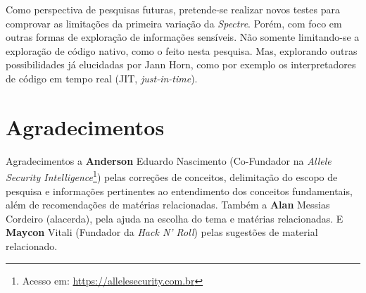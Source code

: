 \documentclass[conference]{IEEEtran}
\begin{document}
Como perspectiva de pesquisas futuras, pretende-se realizar novos testes para comprovar as limitações da primeira variação da \emph{Spectre}. Porém, com foco em outras formas de exploração de informações sensíveis. Não somente limitando-se a exploração de código nativo, como o feito nesta pesquisa. Mas, explorando outras possibilidades já elucidadas por Jann Horn, como por exemplo os interpretadores de código em tempo real (JIT, \emph{just-in-time}).

\section*{Agradecimentos}
Agradecimentos a \textbf{Anderson} Eduardo Nascimento (Co-Fundador na \emph{Allele Security Intelligence}\footnote{Acesso em: \url{https://allelesecurity.com.br}}) pelas correções de conceitos, delimitação do escopo de pesquisa e informações pertinentes ao entendimento dos conceitos fundamentais, além de recomendações de matérias relacionadas. Também a \textbf{Alan} Messias Cordeiro (alacerda), pela ajuda na escolha do tema e matérias relacionadas. E \textbf{Maycon} Vitali (Fundador da \emph{Hack N' Roll}) pelas sugestões de material relacionado.



\end{document}
